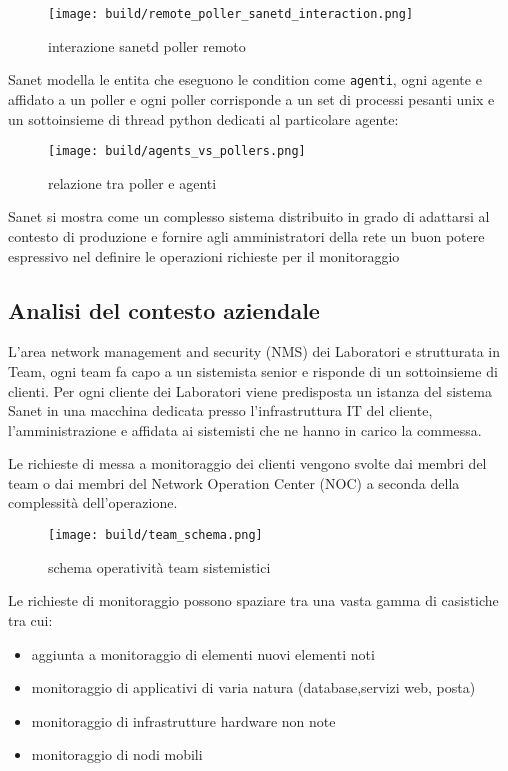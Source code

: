 \begin{figure}[H]
    \centering
    \texttt{[image: build/remote\_poller\_sanetd\_interaction.png]}
    \caption{interazione sanetd poller remoto}
    \label{fig:enter-label}
\end{figure}

Sanet modella le entita che eseguono le condition come \verb|agenti|, ogni agente e affidato a un poller e ogni poller corrisponde a un set di processi pesanti unix e un sottoinsieme di thread python dedicati al particolare agente:


\begin{figure}[H]
    \centering
    \texttt{[image: build/agents\_vs\_pollers.png]}
    \caption{relazione tra poller e agenti}
    \label{fig:enter-label}
\end{figure}

Sanet si mostra come un complesso sistema distribuito in grado di adattarsi al contesto di produzione e fornire agli amministratori della rete un buon potere espressivo nel definire le operazioni richieste per il monitoraggio

\subsection{Analisi del contesto aziendale}

L'area network management and security (NMS) dei Laboratori e strutturata in Team, ogni team fa capo a un sistemista senior e risponde di un sottoinsieme di clienti. Per ogni cliente dei Laboratori viene predisposta un istanza del sistema Sanet in una macchina dedicata presso l'infrastruttura IT del cliente, l'amministrazione e affidata ai sistemisti che ne hanno in carico la commessa.

Le richieste di messa a monitoraggio dei clienti vengono svolte dai membri del team o dai membri del Network Operation Center (NOC) a seconda della complessità dell'operazione.

\begin{figure}[H]
    \centering
    \texttt{[image: build/team\_schema.png]}
    \caption{schema operatività team sistemistici}
    \label{fig:enter-label}
\end{figure}

Le richieste di monitoraggio possono spaziare tra una vasta gamma di casistiche tra cui:

\begin{itemize}
  \item{aggiunta a monitoraggio di elementi nuovi elementi noti}
  \item{monitoraggio di applicativi di varia natura (database,servizi web, posta)}
  \item{monitoraggio di infrastrutture hardware non note}
  \item{monitoraggio di nodi mobili}
\end{itemize}

